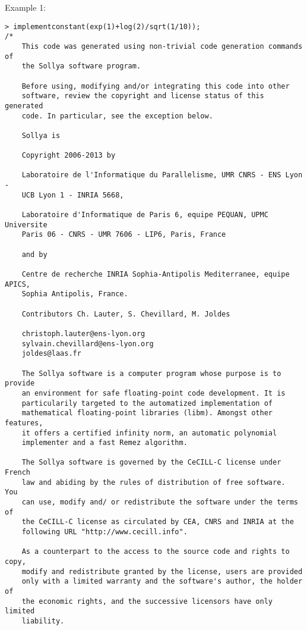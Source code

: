 \noindent Example 1: 
\begin{center}\begin{minipage}{15cm}\begin{Verbatim}[frame=single]
> implementconstant(exp(1)+log(2)/sqrt(1/10));
/*
    This code was generated using non-trivial code generation commands of
    the Sollya software program.
    
    Before using, modifying and/or integrating this code into other
    software, review the copyright and license status of this generated
    code. In particular, see the exception below.
    
    Sollya is
    
    Copyright 2006-2013 by
    
    Laboratoire de l'Informatique du Parallelisme, UMR CNRS - ENS Lyon -
    UCB Lyon 1 - INRIA 5668,
    
    Laboratoire d'Informatique de Paris 6, equipe PEQUAN, UPMC Universite
    Paris 06 - CNRS - UMR 7606 - LIP6, Paris, France
    
    and by
    
    Centre de recherche INRIA Sophia-Antipolis Mediterranee, equipe APICS,
    Sophia Antipolis, France.
    
    Contributors Ch. Lauter, S. Chevillard, M. Joldes
    
    christoph.lauter@ens-lyon.org
    sylvain.chevillard@ens-lyon.org
    joldes@laas.fr
    
    The Sollya software is a computer program whose purpose is to provide
    an environment for safe floating-point code development. It is
    particularily targeted to the automatized implementation of
    mathematical floating-point libraries (libm). Amongst other features,
    it offers a certified infinity norm, an automatic polynomial
    implementer and a fast Remez algorithm.
    
    The Sollya software is governed by the CeCILL-C license under French
    law and abiding by the rules of distribution of free software.  You
    can use, modify and/ or redistribute the software under the terms of
    the CeCILL-C license as circulated by CEA, CNRS and INRIA at the
    following URL "http://www.cecill.info".
    
    As a counterpart to the access to the source code and rights to copy,
    modify and redistribute granted by the license, users are provided
    only with a limited warranty and the software's author, the holder of
    the economic rights, and the successive licensors have only limited
    liability.
    

\end{Verbatim}
\end{minipage}
\end{center}
